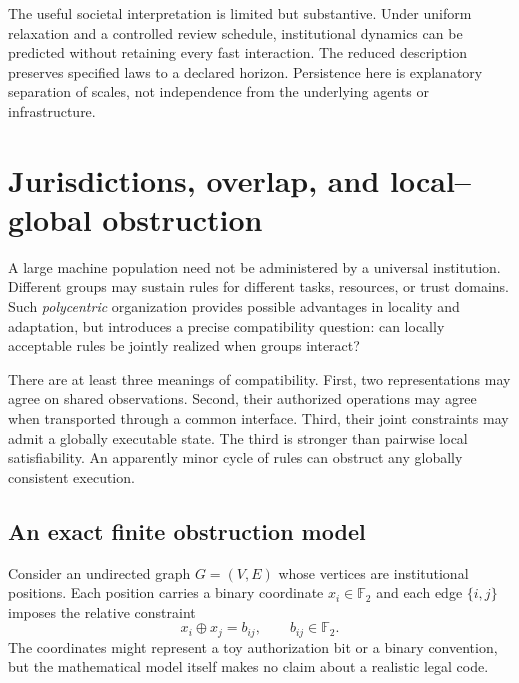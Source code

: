 \documentclass[11pt,letterpaper]{article}
\theoremstyle{plain}
\theoremstyle{definition}
\theoremstyle{remark}
\begin{document}
The useful societal interpretation is limited but substantive. Under uniform relaxation and a controlled review schedule, institutional dynamics can be predicted without retaining every fast interaction. The reduced description preserves specified laws to a declared horizon. Persistence here is explanatory separation of scales, not independence from the underlying agents or infrastructure.


\section{Jurisdictions, overlap, and local--global obstruction}\label{sec:jurisdictions}

A large machine population need not be administered by a universal institution. Different groups may sustain rules for different tasks, resources, or trust domains. Such \emph{polycentric} organization provides possible advantages in locality and adaptation, but introduces a precise compatibility question: can locally acceptable rules be jointly realized when groups interact?

There are at least three meanings of compatibility. First, two representations may agree on shared observations. Second, their authorized operations may agree when transported through a common interface. Third, their joint constraints may admit a globally executable state. The third is stronger than pairwise local satisfiability. An apparently minor cycle of rules can obstruct any globally consistent execution.

\subsection{An exact finite obstruction model}

Consider an undirected graph $G=(V,E)$ whose vertices are institutional positions. Each position carries a binary coordinate $x_i\in\mathbb F_2$ and each edge $\{i,j\}$ imposes the relative constraint
\begin{equation}\label{eq:edge-rule}
x_i\oplus x_j=b_{ij},\qquad b_{ij}\in\mathbb F_2.
\end{equation}
The coordinates might represent a toy authorization bit or a binary convention, but the mathematical model itself makes no claim about a realistic legal code.
\end{document}
